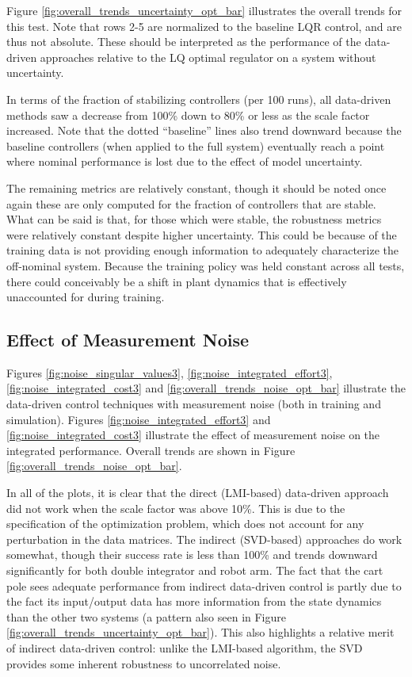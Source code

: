 Figure \ref{fig:overall_trends_uncertainty_opt_bar} illustrates the overall trends for this test.  Note that rows 2-5 are normalized to the baseline LQR control, and are thus not absolute.  These should be interpreted as the performance of the data-driven approaches relative to the LQ optimal regulator on a system without uncertainty.

In terms of the fraction of stabilizing controllers (per 100 runs), all data-driven methods saw a decrease from 100\% down to 80\% or less as the scale factor increased.  Note that the dotted ``baseline'' lines also trend downward because the baseline controllers (when applied to the full system) eventually reach a point where nominal performance is lost due to the effect of model uncertainty.

The remaining metrics are relatively constant, though it should be noted once again these are only computed for the fraction of controllers that are stable.  What can be said is that, for those which were stable, the robustness metrics were relatively constant despite higher uncertainty.  This could be because of the training data is not providing enough information to adequately characterize the off-nominal system.  Because the training policy was held constant across all tests, there could conceivably be a shift in plant dynamics that is effectively unaccounted for during training.

\subsection{Effect of Measurement Noise}
Figures \ref{fig:noise_singular_values3}, \ref{fig:noise_integrated_effort3}, \ref{fig:noise_integrated_cost3} and \ref{fig:overall_trends_noise_opt_bar} illustrate the data-driven control techniques with measurement noise (both in training and simulation).  Figures \ref{fig:noise_integrated_effort3} and \ref{fig:noise_integrated_cost3} illustrate the effect of measurement noise on the integrated performance.  Overall trends are shown in Figure \ref{fig:overall_trends_noise_opt_bar}.

In all of the plots, it is clear that the direct (LMI-based) data-driven approach did not work when the scale factor was above 10\%.  This is due to the specification of the optimization problem, which does not account for any perturbation in the data matrices.  The indirect (SVD-based) approaches do work somewhat, though their success rate is less than 100\% and trends downward significantly for both double integrator and robot arm.  The fact that the cart pole sees adequate performance from indirect data-driven control is partly due to the fact its input/output data has more information from the state dynamics than the other two systems (a pattern also seen in Figure \ref{fig:overall_trends_uncertainty_opt_bar}).  This also highlights a relative merit of indirect data-driven control: unlike the LMI-based algorithm, the SVD provides some inherent robustness to uncorrelated noise.

